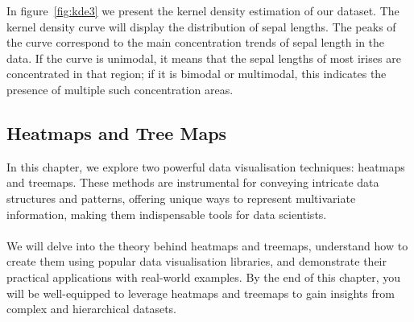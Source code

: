 \documentclass{article}\usepackage[]{graphicx}\usepackage[]{xcolor}
\begin{document}
In figure~\ref{fig:kde3} we present the kernel density estimation of our dataset. The kernel density curve will display the distribution of sepal lengths. The peaks of the curve correspond to the main concentration trends of sepal length in the data. If the curve is unimodal, it means that the sepal lengths of most irises are concentrated in that region; if it is bimodal or multimodal, this indicates the presence of multiple such concentration areas.


\subsection{Heatmaps and Tree Maps}
In this chapter, we explore two powerful data visualisation techniques: heatmaps and treemaps. These methods are instrumental for conveying intricate data structures and patterns, offering unique ways to represent multivariate information, making them indispensable tools for data scientists.
\\  
\\We will delve into the theory behind heatmaps and treemaps, understand how to create them using popular data visualisation libraries, and demonstrate their practical applications with real-world examples. By the end of this chapter, you will be well-equipped to leverage heatmaps and treemaps to gain insights from complex and hierarchical datasets.
\end{document}
